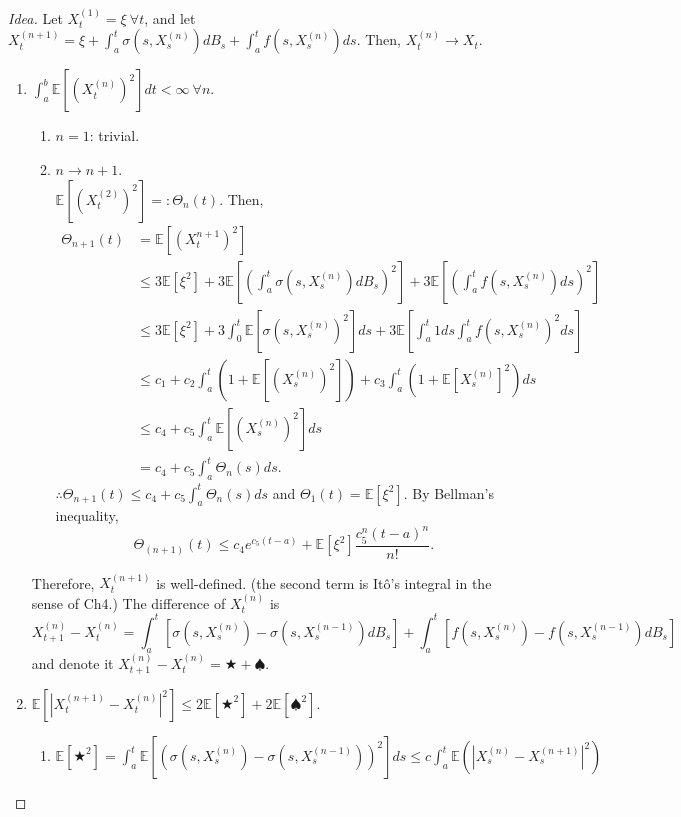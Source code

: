 \documentclass[12pt]{report}
\newcommand{\E}{\mathbb{E}}
\renewcommand{\1}{\mathbb{1}}
\theoremstyle{break}
\theoremstyle{newdef}
\theoremstyle{remark}
\begin{document}
\begin{proof}[Idea]
Let $X_t^{(1)} = \xi \ \forall t$, and let $X_t^{(n+1)} = \xi + \int_a^t \sigma(s,X_s^{(n)})dB_s + \int_a^t f(s,X_s^{(n)})ds$.
Then, $X_t^{(n)} \rightarrow X_t$.

\begin{enumerate}[wide]
\item
$\int_a^b \E[(X_t^{(n)})^2]dt < \infty \ \forall n$.
\begin{enumerate}
\item $n = 1$: trivial.
\item $n \rightarrow n+1$.\\
$\E[(X_t^{(2)})^2] =: \Theta_n(t)$.
Then,
$$
\begin{aligned}
\Theta_{n+1}(t) &= \E\left[(X_t^{n+1})^2\right]\\
&\leq 3\E[\xi^2] + 3\E\left[\left( \int_a^t \sigma(s,X_s^{(n)})dB_s \right)^2\right] + 3\E\left[\left( \int_a^t f(s,X_s^{(n)})ds \right)^2\right]\\
&\leq 3\E[\xi^2] + 3\int_0^t \E\left[\sigma(s,X_s^{(n)})^2\right]ds + 3\E\left[ \int_a^t 1ds \int_a^t f(s,X_s^{(n)})^2ds \right]\\
&\leq c_1 + c_2\int_a^t \left(1 + \E\left[\left(X_s^{(n)}\right)^2\right]\right) + c_3 \int_a^t \left(1+\E[X_s^{(n)}]^2\right)ds\\
&\leq c_4 + c_5 \int_a^t \E\left[(X_s^{(n)})^2\right]ds\\
&= c_4 + c_5 \int_a^t \Theta_n (s)ds.
\end{aligned}
$$
$\therefore \Theta_{n+1}(t) \leq c_4 + c_5 \int_a^t \Theta_n(s)ds$ and $\Theta_1(t) = \E[\xi^2]$.
By Bellman's inequality,
$$
\Theta_{(n+1)}(t) \leq c_4 e^{c_5(t-a)} + \E[\xi^2]\frac{c_5^n(t-a)^n}{n!}.
$$
\end{enumerate}
Therefore, $X_t^{(n+1)}$ is well-defined. (the second term is It\^o's integral in the sense of Ch4.)
The difference of $X_{t}^{(n)}$ is
$$
X_{t+1}^{(n)} - X_{t}^{(n)} = \int_a^t \left[ \sigma(s,X_s^{(n)}) - \sigma(s,X_s^{(n-1)})dB_s \right]
+ \int_a^t \left[ f(s,X_s^{(n)}) - f(s,X_s^{(n-1)})dB_s \right]
$$
and denote it $X_{t+1}^{(n)} - X_t^{(n)} = \bigstar + \spadesuit$.

\item
$\E\left[|X_t^{(n+1)} - X_t^{(n)}|^2\right] \leq 2\E[\bigstar^2] + 2\E[\spadesuit^2].$

\begin{enumerate}[wide]
\item
$\E[\bigstar^2] = \int_a^t \E\left[ \left( \sigma(s,X_s^{(n)}) - \sigma(s,X_s^{(n-1)}) \right)^2 \right]ds
\leq c\int_a^t \E\left(|X_s^{(n)} - X_s^{(n+1)}|^2\right)$


\end{enumerate}
\end{enumerate}
\end{proof}
\end{document}
